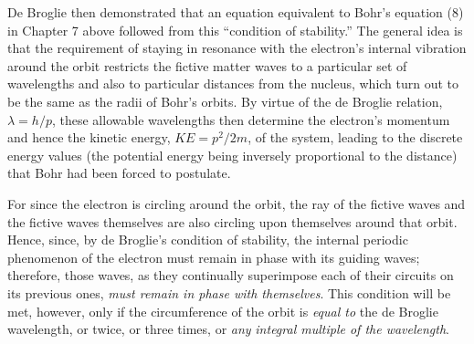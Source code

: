 De Broglie then demonstrated that an equation equivalent to Bohr's
equation (8) in Chapter 7 above followed from this ``condition of
stability.'' The general idea is that the requirement of staying in
resonance with the electron's internal vibration around the orbit
restricts the fictive matter waves to a particular set of wavelengths
and also to particular distances from the nucleus, which turn out to be
the same as the radii of Bohr's orbits. By virtue of the de Broglie
relation, $\lambda = h/p$, these allowable wavelengths then
determine the electron's momentum and hence the kinetic energy,
$KE = p^2/2m$, of the system,
leading to the discrete energy values (the potential energy being
inversely proportional to the distance) that Bohr had been forced to
postulate.

For since the electron is circling around the orbit, the ray of the
fictive waves and the fictive waves themselves are also circling upon
themselves around that orbit. Hence, since, by de Broglie's condition of
stability, the internal periodic phenomenon of the electron must remain
in phase with its guiding waves; therefore, those waves, as they
continually superimpose each of their circuits on its previous ones,
\emph{must remain in phase with themselves}. This condition will be met,
however, only if the circumference of the orbit is \emph{equal to} the
de Broglie wavelength, or twice, or three times, or \emph{any}
\emph{integral multiple of the wavelength}.

